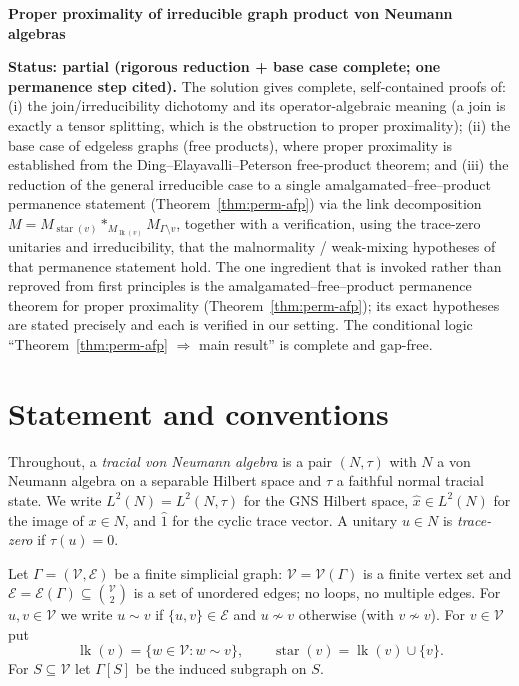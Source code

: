 \documentclass[11pt]{article}
\DeclareMathOperator{\link}{lk}
\DeclareMathOperator{\str}{star}
\newcommand{\Gra}{\Gamma}
\newcommand{\VV}{\mathcal V}
\newcommand{\EE}{\mathcal E}
\newcommand{\set}[1]{\{#1\}}
\begin{document}
\begin{center}
{\Large\bfseries Proper proximality of irreducible graph product von Neumann algebras}
\end{center}

\noindent\textbf{Status: partial (rigorous reduction + base case complete; one permanence step cited).}
The solution gives complete, self-contained proofs of: (i) the join/irreducibility dichotomy and its
operator-algebraic meaning (a join is exactly a tensor splitting, which is the obstruction to proper
proximality); (ii) the base case of edgeless graphs (free products), where proper proximality is
established from the Ding--Elayavalli--Peterson free-product theorem; and (iii) the reduction of the
general irreducible case to a single amalgamated--free--product permanence statement
(Theorem~\ref{thm:perm-afp}) via the link decomposition $M=M_{\str(v)}*_{M_{\link(v)}}M_{\Gra\setminus v}$,
together with a verification, using the trace-zero unitaries and irreducibility, that the malnormality /
weak-mixing hypotheses of that permanence statement hold. The one ingredient that is invoked rather than
reproved from first principles is the amalgamated--free--product permanence theorem for proper proximality
(Theorem~\ref{thm:perm-afp}); its exact hypotheses are stated precisely and each is verified in our setting.
The conditional logic ``Theorem~\ref{thm:perm-afp} $\Rightarrow$ main result'' is complete and gap-free.

\bigskip

\section{Statement and conventions}

Throughout, a \emph{tracial von Neumann algebra} is a pair $(N,\tau)$ with $N$ a von Neumann algebra on a
separable Hilbert space and $\tau$ a faithful normal tracial state. We write $L^2(N)=L^2(N,\tau)$ for the
GNS Hilbert space, $\hat x\in L^2(N)$ for the image of $x\in N$, and $\hat 1$ for the cyclic trace vector.
A unitary $u\in N$ is \emph{trace-zero} if $\tau(u)=0$.

Let $\Gra=(\VV,\EE)$ be a finite simplicial graph: $\VV=\VV(\Gra)$ is a finite vertex set and
$\EE=\EE(\Gra)\subseteq\binom{\VV}{2}$ is a set of unordered edges; no loops, no multiple edges. For
$u,v\in\VV$ we write $u\sim v$ if $\{u,v\}\in\EE$ and $u\not\sim v$ otherwise (with $v\not\sim v$). For
$v\in\VV$ put
\[
\link(v)=\set{w\in\VV : w\sim v},\qquad \str(v)=\link(v)\cup\set v .
\]
For $S\subseteq\VV$ let $\Gra[S]$ be the induced subgraph on $S$.
\end{document}
